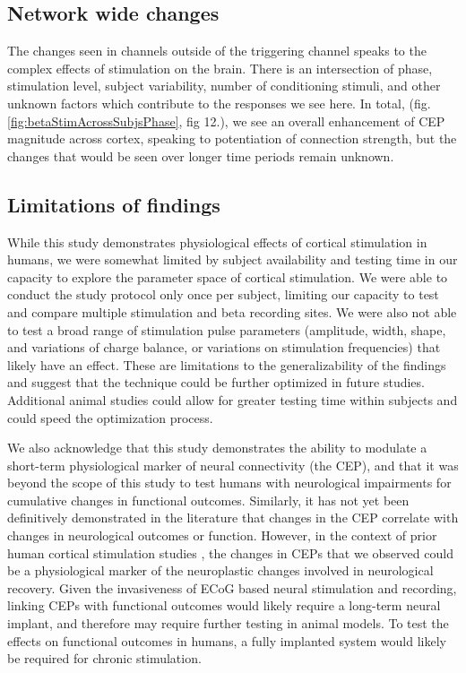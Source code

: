\subsection{Network wide changes}
The changes seen in channels outside of the triggering channel speaks to the complex effects of stimulation on the brain. There is an intersection of phase, stimulation level, subject variability, number of conditioning stimuli, and other unknown factors which contribute to the responses we see here. In total, (fig. \ref{fig:betaStimAcrossSubjsPhase}, fig 12.), we see an overall enhancement of CEP magnitude across cortex, speaking to potentiation of connection strength, but the changes that would be seen over longer time periods remain unknown. 

\subsection{Limitations of findings}
While this study demonstrates physiological effects of cortical stimulation in humans, we were somewhat limited by subject availability and testing time in our capacity to explore the parameter space of cortical stimulation. We were able to conduct the study protocol only once per subject, limiting our capacity to test and compare multiple stimulation and beta recording sites. We were also not able to test a broad range of stimulation pulse parameters (amplitude, width, shape, and variations of charge balance, or variations on stimulation frequencies) that likely have an effect. These are limitations to the generalizability of the findings and suggest that the technique could be further optimized in future studies. Additional animal studies could allow for greater testing time within subjects and could speed the optimization process.

We also acknowledge that this study demonstrates the ability to modulate a short-term physiological marker of neural connectivity (the CEP), and that it was beyond the scope of this study to test humans with neurological impairments for cumulative changes in functional outcomes. Similarly, it has not yet been definitively demonstrated in the literature that changes in the CEP correlate with changes in neurological outcomes or function. However, in the context of prior human cortical stimulation studies \cite{Levy2008,Huang2008a,Harvey2009,Plow2009,Buetefisch2011,Mrachacz-Kersting2015a,Kraus2016}, the changes in CEPs that we observed could be a physiological marker of the neuroplastic changes involved in neurological recovery. Given the invasiveness of ECoG based neural stimulation and recording, linking CEPs with functional outcomes would likely require a long-term neural implant, and therefore may require further testing in animal models. To test the effects on functional outcomes in humans, a fully implanted system would likely be required for chronic stimulation. 

